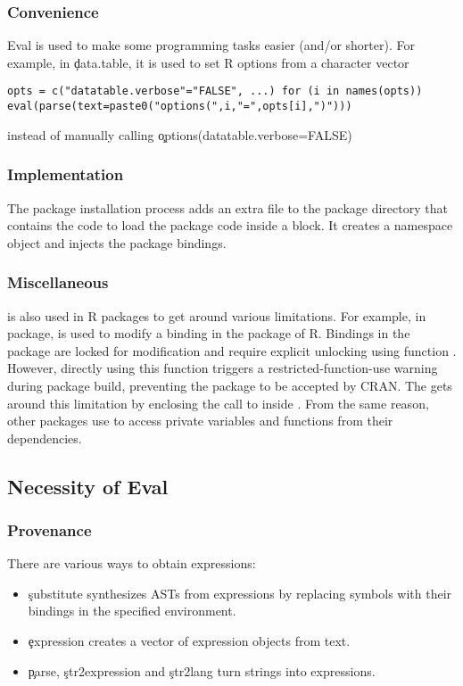 \documentclass[USenglish,cleveref, autoref, thm-restate]{lipics-v2019}
\begin{document}
\subsubsection{Convenience}
Eval is used to make some programming tasks easier (and/or shorter).
For example, in \c{data.table}, it is used to set R options from a
character vector
  \begin{lstlisting}
opts = c("datatable.verbose"="FALSE", ...) for (i in names(opts))
eval(parse(text=paste0("options(",i,"=",opts[i],")")))

  \end{lstlisting}
instead of manually calling \c{options(datatable.verbose=FALSE)}

\subsubsection{Implementation}
The package installation process adds an extra file to the package
directory that contains the code to load the package code inside a
\local block. It creates a namespace object and injects the package
bindings.

\subsubsection{Miscellaneous}
\eval is also used in R packages to get around various limitations.
For example, in \datatable package, \eval is used to modify a binding
in the \base package of R. Bindings in the \base package are locked
for modification and require explicit unlocking using function
\unlockBinding. However, directly using this function triggers a
restricted-function-use warning during package build, preventing the
package to be accepted by CRAN. The \datatable gets around this
limitation by enclosing the call to \unlockBinding inside \eval. From
the same reason, other packages use \eval to access private variables
and functions from their dependencies.

\subsection{Necessity of Eval}

\subsubsection{Provenance}

There are various ways to obtain expressions:
\begin{itemize}
  \item \c{substitute} synthesizes ASTs from expressions by replacing
    symbols with their bindings in the specified environment.
  \item \c{expression}  creates a vector of expression
    objects from text.
  \item \c{parse}, \c{str2expression} and \c{str2lang} turn strings into
    expressions.
\end{itemize}
\end{document}
